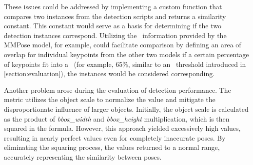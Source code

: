These issues could be addressed by implementing a custom function that compares two instances from the detection scripts and returns a similarity constant. This constant would serve as a basis for determining if the two detection instances correspond. Utilizing the \BBOX\ information provided by the MMPose model, for example, could facilitate comparison by defining an area of overlap for individual keypoints from the other two models if a certain percentage of keypoints fit into a \BBOX\ (for example, 65\%, similar to an \IoU\ threshold introduced in [section:evaluation]), the instances would be considered corresponding.

Another problem arose during the evaluation of detection performance. The {\bf \OKS} metric utilizes the object scale to normalize the value and mitigate the disproportionate influence of larger objects. Initially, the object scale is calculated as the product of {\it bbox_width} and {\it bbox_height} multiplication, which is then squared in the {\bf \OKS} formula. However, this approach yielded excessively high values, resulting in nearly perfect {\bf \OKS} values even for completely inaccurate poses. By eliminating the squaring process, the {\bf \OKS} values returned to a normal range, accurately representing the similarity between poses.
